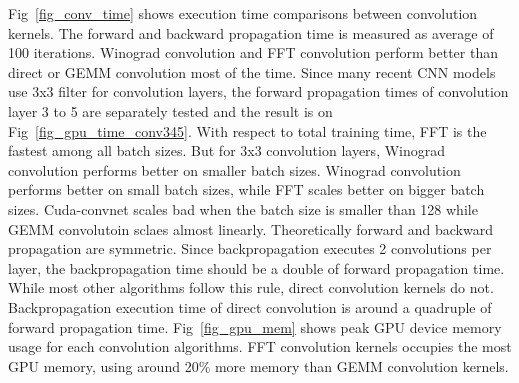 Fig~\ref{fig_conv_time} shows execution time comparisons between convolution kernels.
The forward and backward propagation time is measured as average of 100 iterations.
Winograd convolution and FFT convolution perform better than direct or GEMM convolution most of the time.
Since many recent CNN models use 3x3 filter for convolution layers\cite{vgg}, the forward propagation times of convolution layer 3 to 5 are separately tested and the result is on Fig~\ref{fig_gpu_time_conv345}.
With respect to total training time, FFT is the fastest among all batch sizes.
But for 3x3 convolution layers, Winograd convolution performs better on smaller batch sizes.
Winograd convolution performs better on small batch sizes, while FFT scales better on bigger batch sizes.
Cuda-convnet scales bad when the batch size is smaller than 128 while GEMM convolutoin sclaes almost linearly.
Theoretically forward and backward propagation are symmetric.
Since backpropagation executes 2 convolutions per layer, the backpropagation time should be a double of forward propagation time.
While most other algorithms follow this rule, direct convolution kernels do not.
Backpropagation execution time of direct convolution is around a quadruple of forward propagation time.
Fig~\ref{fig_gpu_mem} shows peak GPU device memory usage for each convolution algorithms.
FFT convolution kernels occupies the most GPU memory, using around 20\% more memory than GEMM convolution kernels.

